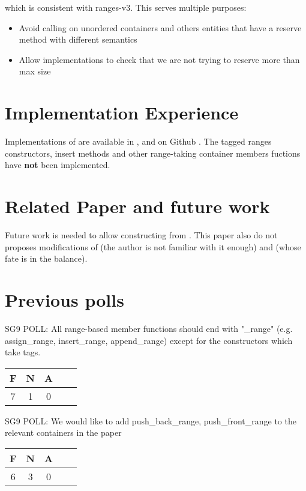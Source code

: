 \documentclass{wg21}
\begin{document}
which is consistent with ranges-v3. This serves multiple purposes:

\begin{itemize}
\item Avoid calling  on unordered containers and others entities that have a reserve method with different
semantics
\item Allow implementations to check that we are not trying to reserve more than max size
\end{itemize}


\section{Implementation Experience}

Implementations of  are available in \cite{Range V3}, \cite{cmcstl2} and on Github \cite{rangesnext}.
The tagged ranges constructors, insert methods and other range-taking container members fuctions have \textbf{not} been
implemented.

\section{Related Paper and future work}

Future work is needed to allow constructing  from .
This paper also do not proposes modifications of (the author is not familiar with it enough) and  (whose fate is in the balance).

\section{Previous polls}


\begin{quoteblock}
SG9 POLL: All range-based member functions should end with "_range" (e.g. assign_range, insert_range, append_range) except for the constructors which take tags.

\begin{tabular}{|c|c|c|c|c|}
\hline
F & N & A\\
\hline
7 & 1 & 0 \\
\hline
\end{tabular}
\end{quoteblock}

\begin{quoteblock}
SG9 POLL: We would like to add push_back_range, push_front_range to the relevant containers in the paper

\begin{tabular}{|c|c|c|c|c|}
    \hline
    F & N & A\\
    \hline
    6 & 3 & 0 \\
    \hline
\end{tabular}
\end{quoteblock}
\end{document}
